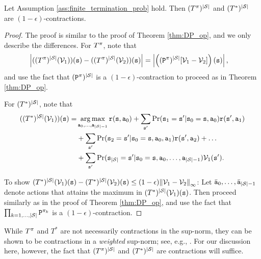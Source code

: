 \begin{theorem}
    Let Assumption \ref{ass:finite_termination_prob} hold. Then $(T^{\pi})^{|\mathcal{S}|}$ and $(T^*)^{|\mathcal{S}|}$ are $(1-\epsilon)$-contractions.
\end{theorem}
\begin{proof}
The proof is similar to the proof of Theorem \ref{thm:DP_op}, and we only describe the differences. For $T^\pi$, note that 
    \begin{align*}
    \left| ((T^{\pi})^{|\mathcal{S}|} (\mathcal{V}_1))({\tt s}) - ((T^{\pi})^{|\mathcal{S}|} (\mathcal{V}_2))({\tt s}) \right| &= \left| \left(({\tt P}^\pi)^{|\mathcal{S}|}[\mathcal{V}_1 - \mathcal{V}_2]\right)({\tt s})  \right|,
    \end{align*}
and use the fact that $({\tt P}^\pi)^{|\mathcal{S}|}$ is a $(1-\epsilon)$-contraction to proceed as in Theorem \ref{thm:DP_op}.

For $(T^*)^{|\mathcal{S}|}$, note that
\begin{equation*}
\begin{split}
    ((T^*)^{|\States|}(\Value_1))(\state) = &\argmax_{\action_0,\dots,\action_{|\States|-1}} \reward(\state,\action_0) + \sum_{\state'}\Pr(\state_1=\state'|\state_0=\state,\action_0)\reward(\state',\action_1) \\
    &+ \sum_{\state'}\Pr(\state_2=\state'|\state_0=\state,\action_0,\action_1)\reward(\state',\action_2) + \dots \\
    &+ \sum_{\state'}\Pr(\state_{|\States|}=\state'|\state_0=\state,\action_0,\dots,\action_{|\States|-1})\Value_1(\state') .
\end{split}
\end{equation*}

To show $(T^*)^{|\mathcal{S}|}({\mathcal{V}_1})({\tt s}) - (T^*)^{|\mathcal{S}|}({\mathcal{V}_2})({\tt s})
\le (1-\epsilon) {\left\| {{\mathcal{V}_1} - {\mathcal{V}_2}} \right\|_\infty }$:
Let $\bar {{\tt a}}_0,\dots,\bar {{\tt a}}_{|\mathcal{S}|-1}$ denote actions that attains the maximum in
$(T^*)^{|\mathcal{S}|}({\mathcal{V}_1})({\tt s})$.
 Then proceed similarly as in the proof of Theorem \ref{thm:DP_op}, and use the fact that $\prod_{k=1,\dots,|\mathcal{S}|} {\tt P}^{\pi_k}$ is a $(1-\epsilon)$-contraction.
\end{proof}

\begin{remark}
    While $T^{\pi}$ and $T^*$ are not necessarily contractions in the sup-norm, they can be shown to be contractions in a \textit{weighted} sup-norm; see, e.g., \cite{Bertsekas05}. For our discussion here, however, the fact that $(T^{\pi})^{|\mathcal{S}|}$ and $(T^*)^{|\mathcal{S}|}$ are contractions will suffice.
\end{remark}

